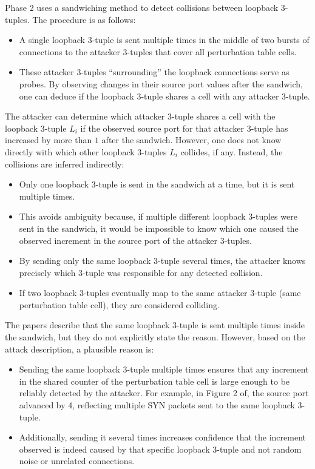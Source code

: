 \documentclass{report}
\begin{document}
Phase 2 uses a \alert{sandwiching method} to detect collisions between loopback 3-tuples. The procedure is as follows:

\begin{itemize}
	\item A single loopback 3-tuple is sent multiple times in the middle of two bursts of connections to the attacker 3-tuples that cover all perturbation table cells.
	\item These attacker 3-tuples “surrounding” the loopback connections serve as probes. By observing changes in their source port values after the sandwich, one can deduce if the loopback 3-tuple shares a cell with any attacker 3-tuple.
\end{itemize}

The attacker can determine which attacker 3-tuple shares a cell with the loopback 3-tuple $L_i$ if the observed source port for that attacker 3-tuple has increased by more than $1$ after the sandwich. However, one does not know directly with which other loopback 3-tuples $L_i$ collides, if any. Instead, the collisions are inferred indirectly:

\begin{itemize}
	\item Only one loopback 3-tuple is sent in the sandwich at a time, but it is sent multiple times.
	\item This avoids ambiguity because, if multiple different loopback 3-tuples were sent in the sandwich, it would be impossible to know which one caused the observed increment in the source port of the attacker 3-tuples.
	\item By sending only the same loopback 3-tuple several times, the attacker knows precisely which 3-tuple was responsible for any detected collision.
	\item If two loopback 3-tuples eventually map to the same attacker 3-tuple (same perturbation table cell), they are considered colliding.
\end{itemize}

The papers describe that the same loopback 3-tuple is sent multiple times inside the sandwich, but they do not explicitly state the reason. However, based on the attack description, a plausible reason is:

\begin{itemize}
	\item Sending the same loopback 3-tuple multiple times ensures that any increment in the shared counter of the perturbation table cell is large enough to be reliably detected by the attacker. For example, in Figure 2 of, the source port advanced by 4, reflecting multiple SYN packets sent to the same loopback 3-tuple.
	\item Additionally, sending it several times increases confidence that the increment observed is indeed caused by that specific loopback 3-tuple and not random noise or unrelated connections.
\end{itemize}
\end{document}
